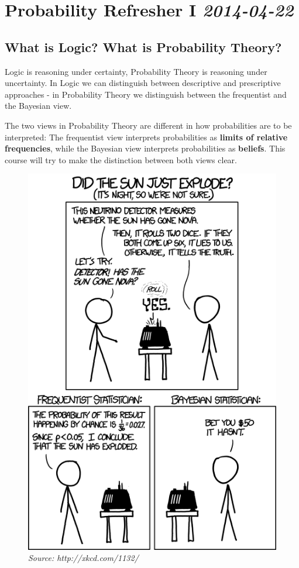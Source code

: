 \section[2014-04-22: Probability Refresher I]{Probability Refresher I \small{\textit{2014-04-22}}}

\subsection*{What is Logic? What is Probability Theory?}

Logic is reasoning under certainty, Probability Theory is reasoning under uncertainty. In Logic we can distinguish between descriptive and prescriptive approaches - in Probability Theory we distinguish between the frequentist and the Bayesian view.

The two views in Probability Theory are different in how probabilities are to be interpreted: The frequentist view interprets probabilities as \textbf{limits of relative frequencies}, while the Bayesian view interprets probabilities as \textbf{beliefs}. This course will try to make the distinction between both views clear.

\begin{figure}[h]
     \centering
     \includegraphics[scale=0.5]{xkcd_frequentists_vs_bayesians}
     \caption{\textit{Source: http://xkcd.com/1132/}}
\end{figure}

